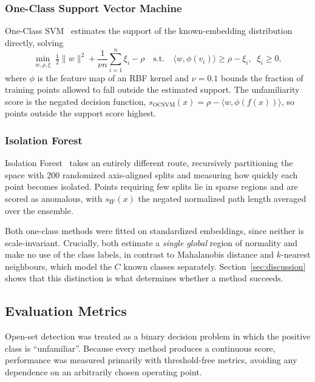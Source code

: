 \documentclass[11pt]{article}
\begin{document}
\subsubsection{One-Class Support Vector Machine}

One-Class SVM~\cite{scholkopf2001estimating} estimates the support of the known-embedding distribution directly, solving
\begin{equation}
\min_{w, \rho, \xi} \; \tfrac{1}{2}\lVert w \rVert^2 + \frac{1}{\nu n}\sum_{i=1}^{n} \xi_i - \rho
\quad \text{s.t.} \quad \langle w, \phi(v_i) \rangle \geq \rho - \xi_i, \;\; \xi_i \geq 0,
\end{equation}
where $\phi$ is the feature map of an RBF kernel and $\nu = 0.1$ bounds the fraction of training points allowed to fall outside the estimated support. The unfamiliarity score is the negated decision function, $s_{\text{OCSVM}}(x) = \rho - \langle w, \phi(f(x)) \rangle$, so points outside the support score highest.

\subsubsection{Isolation Forest}

Isolation Forest~\cite{liu2008isolation} takes an entirely different route, recursively partitioning the space with 200 randomized axis-aligned splits and measuring how quickly each point becomes isolated. Points requiring few splits lie in sparse regions and are scored as anomalous, with $s_{\text{IF}}(x)$ the negated normalized path length averaged over the ensemble.

Both one-class methods were fitted on standardized embeddings, since neither is scale-invariant. Crucially, both estimate a \emph{single global} region of normality and make no use of the class labels, in contrast to Mahalanobis distance and $k$-nearest neighbours, which model the $C$ known classes separately. Section~\ref{sec:discussion} shows that this distinction is what determines whether a method succeeds.

\subsection{Evaluation Metrics}

Open-set detection was treated as a binary decision problem in which the positive class is ``unfamiliar''. Because every method produces a continuous score, performance was measured primarily with threshold-free metrics, avoiding any dependence on an arbitrarily chosen operating point.
\end{document}
